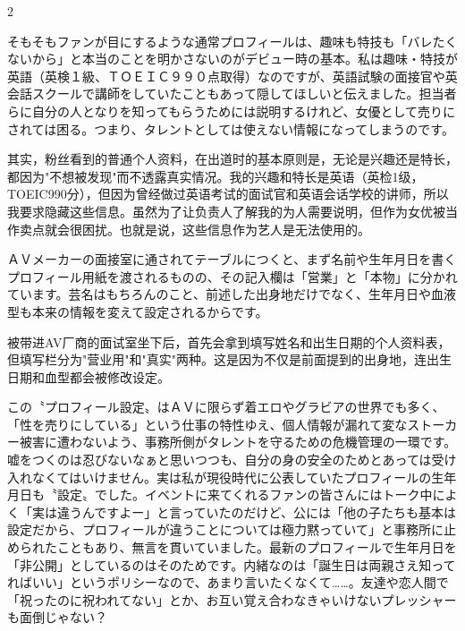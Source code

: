 \documentclass[12pt,UTF8]{ctexbook}
\begin{document}
\begin{paracol}{2}

そもそもファンが目にするような通常プロフィールは、趣味も特技も「バレたくないから」と本当のことを明かさないのがデビュー時の基本。私は趣味・特技が英語（英検１級、ＴＯＥＩＣ９９０点取得）なのですが、英語試験の面接官や英会話スクールで講師をしていたこともあって隠してほしいと伝えました。担当者らに自分の人となりを知ってもらうためには説明するけれど、女優として売りにされては困る。つまり、タレントとしては使えない情報になってしまうのです。

\switchcolumn

其实，粉丝看到的普通个人资料，在出道时的基本原则是，无论是兴趣还是特长，都因为"不想被发现"而不透露真实情况。我的兴趣和特长是英语（英检1级，TOEIC990分），但因为曾经做过英语考试的面试官和英语会话学校的讲师，所以我要求隐藏这些信息。虽然为了让负责人了解我的为人需要说明，但作为女优被当作卖点就会很困扰。也就是说，这些信息作为艺人是无法使用的。

\switchcolumn*

ＡＶメーカーの面接室に通されてテーブルにつくと、まず名前や生年月日を書くプロフィール用紙を渡されるものの、その記入欄は「営業」と「本物」に分かれています。芸名はもちろんのこと、前述した出身地だけでなく、生年月日や血液型も本来の情報を変えて設定されるからです。

\switchcolumn

被带进AV厂商的面试室坐下后，首先会拿到填写姓名和出生日期的个人资料表，但填写栏分为"营业用"和"真实"两种。这是因为不仅是前面提到的出身地，连出生日期和血型都会被修改设定。

\switchcolumn*

この〝プロフィール設定〟はＡＶに限らず着エロやグラビアの世界でも多く、「性を売りにしている」という仕事の特性ゆえ、個人情報が漏れて変なストーカー被害に遭わないよう、事務所側がタレントを守るための危機管理の一環です。嘘をつくのは忍びないなぁと思いつつも、自分の身の安全のためとあっては受け入れなくてはいけません。実は私が現役時代に公表していたプロフィールの生年月日も〝設定〟でした。イベントに来てくれるファンの皆さんにはトーク中によく「実は違うんですよー」と言っていたのだけど、公には「他の子たちも基本は設定だから、プロフィールが違うことについては極力黙っていて」と事務所に止められたこともあり、無言を貫いていました。最新のプロフィールで生年月日を「非公開」としているのはそのためです。内緒なのは「誕生日は両親さえ知ってればいい」というポリシーなので、あまり言いたくなくて……。友達や恋人間で「祝ったのに祝われてない」とか、お互い覚え合わなきゃいけないプレッシャーも面倒じゃない？


\end{paracol}
\end{document}
